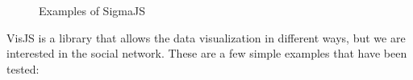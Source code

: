 \documentclass[a4paper, 12pt]{book}
\begin{document}
\begin{figure}[H]
 \centering
 \caption{Examples of SigmaJS}
 \label{f:sigmaexamples}
\end{figure}

VisJS is a library that allows the data visualization in different ways, but we are interested in the social network. These are a few simple examples that have been tested:
\end{document}

